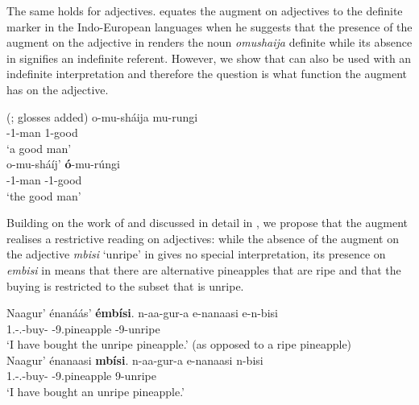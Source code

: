 \documentclass[output=paper]{langscibook}
\begin{document}
The same holds for adjectives. \citet{Taylor1972, Taylor1985} equates the augment on adjectives to the definite marker in the Indo-European languages when he suggests that the presence of the augment on the adjective in  renders the noun \textit{omushaija} definite while its absence in  signifies an indefinite referent. However, we show that  can also be used with an indefinite interpretation and therefore the question is what function the augment has on the adjective.

\ea
\label{bkm:Ref111493957}(\citealt[74]{Taylor1972}; glosses added)
\ea
\label{bkm:Ref111493957:a}
\gll
o-mu-sháija  mu-rungi\\
\AUG{}-1-man  1-good\\
\glt
‘a good man’\\


\ex
\label{bkm:Ref111493957:b}
\gll
o-mu-sháíj’  \textbf{ó}-mu-rúngi\\
\AUG{}-1-man  \AUG{}-1-good\\
\glt
‘the good man’\\


\z
\z

Building on the work of \citet{Asiimwe2014} and discussed in detail in \citet{AsiimweEtAl2023}, we propose that the augment realises a restrictive reading on adjectives: while the absence of the augment on the adjective \textit{mbisi} ‘unripe’ in  gives no special interpretation, its presence on \textit{embisi} in  means that there are alternative pineapples that are ripe and that the buying is restricted to the subset that is unripe.\pagebreak

\ea
\label{bkm:Ref111494100}\citep[1294]{AsiimweEtAl2023}
\settowidth\jamwidth{[+A]}
\ea
\label{bkm:Ref111494100:a}
Naagur’ énanáás’ \textbf{émbísi}.  \jambox*{[+A]}
\gll
n-aa-gur-a  e-nanaasi  e-n-bisi\\
1\SG{}.\SM{}-\N{}.\PST{}-buy-\FV{}  \AUG{}-9.pineapple  \AUG{}-9-unripe\\
\glt
‘I have bought the unripe pineapple.’ (as opposed to a ripe pineapple)\\

\ex
\label{bkm:Ref111494100:b}   
Naagur’ énanaasi \textbf{mbísi}.  \jambox*{[-A]}
\gll
    n-aa-gur-a  e-nanaasi  n-bisi\\
1\SG{}.\SM{}-\N{}.\PST{}-{}buy-\FV{}  \AUG{}-9.pineapple  9-unripe\\
\glt ‘I have bought an unripe pineapple.’\\
\end{document}
